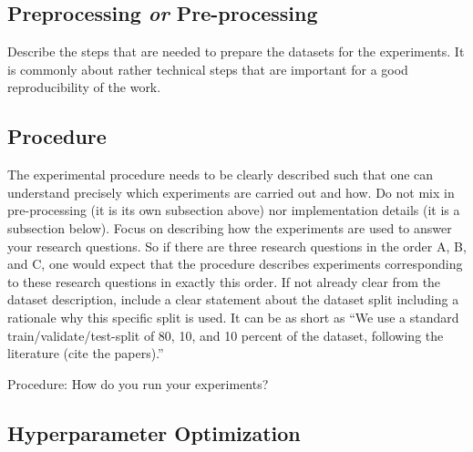 \documentclass[sigconf, review, nonacm]{acmart}
\begin{document}
\subsection{Preprocessing \textit{or} Pre-processing}
\label{sec:preprocessing}

Describe the steps that are needed to prepare the datasets for the experiments.
It is commonly about rather technical steps that are important for a good reproducibility of the work.

\subsection{Procedure}
\label{sec:procedure}

\begin{tcolorbox}
    [title=Procedure: What needs to be described to understand the experiments.]
    The experimental procedure needs to be clearly described such that one can understand precisely which experiments are carried out and how. 
    Do not mix in pre-processing (it is its own subsection above) nor implementation details (it is a subsection below). 
    Focus on describing how the experiments are used to answer your research questions. 
    So if there are three research questions in the order A, B, and C, one would expect that the procedure describes experiments corresponding to these research questions in exactly this order. 
    If not already clear from the dataset description, include a clear statement about the dataset split including a rationale why this specific split is used. 
    It can be as short as ``We use a standard train/validate/test-split of 80, 10, and 10 percent of the dataset, following the literature (cite the papers).''

\end{tcolorbox}


Procedure: How do you run your experiments?

\subsection{Hyperparameter Optimization}
\label{sec:hyperparameteroptimization}

\end{document}
